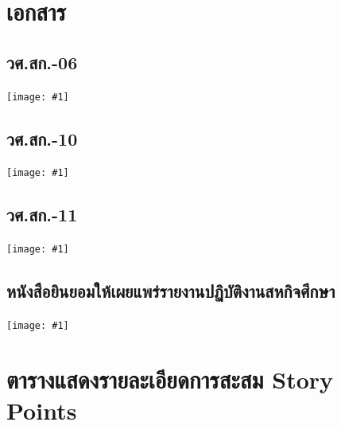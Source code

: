 \newcommand{\skibidione}[1]{
    \begin{center}
    \texttt{[image: \#1]}
    \end{center}
}

\newcommand{\skibidi}[1]{
    \begin{center}
        \texttt{[image: \#1]}
    \end{center}
    
}

\chapter{เอกสาร}

\section{วศ.สก.-06}
\skibidi{resources/bureaucrats/coop6.pdf}

\section{วศ.สก.-10}
\skibidi{resources/bureaucrats/coop10.pdf}

\section{วศ.สก.-11}
\skibidione{resources/bureaucrats/coop11.pdf}

\section{หนังสือยินยอมให้เผยแพร่รายงานปฏิบัติงานสหกิจศึกษา}
\skibidione{resources/bureaucrats/publish-consent.pdf}

\chapter{ตารางแสดงรายละเอียดการสะสม Story Points}
